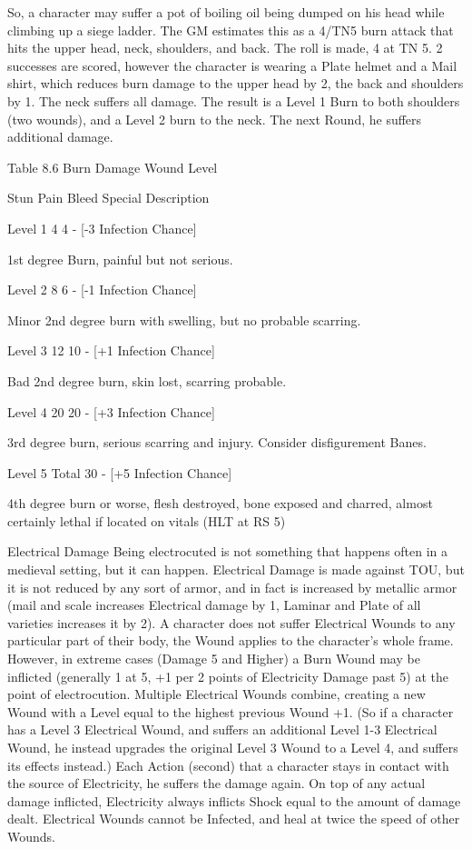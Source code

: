 \documentclass[oneside,11pt,english]{book}
\begin{document}
 

So, a character may suffer a pot of boiling oil being dumped on his head while climbing up a siege ladder. 
The GM estimates this as a 4/TN5 burn attack that hits the upper head, neck, shoulders, and back. The 
roll is made, 4 at TN 5. 
2 successes are scored, however the character is wearing a Plate helmet and a Mail shirt, which reduces 
burn damage to the upper head by 2, the back and shoulders by 1. The neck suffers all damage. 
The result is a Level 1 Burn to both shoulders (two wounds), and a Level 2 burn to the neck. The next 
Round, he suffers additional damage. 

 


Table 8.6 Burn Damage 
Wound 
Level 

Stun Pain Bleed Special Description 

Level 1 4 4 - [-3 Infection 
Chance] 

1st degree Burn, painful but not serious. 

Level 2 8 6 - [-1 Infection 
Chance] 

Minor 2nd degree burn with swelling, but no probable 
scarring. 

Level 3 12 10 - [+1 Infection 
Chance] 

Bad 2nd degree burn, skin lost, scarring probable. 

Level 4 20 20 - [+3 Infection 
Chance] 

3rd degree burn, serious scarring and injury. Consider 
disfigurement Banes. 

Level 5 Total 30 - [+5 Infection 
Chance] 

4th degree burn or worse, flesh destroyed, bone 
exposed and charred, almost certainly lethal if located 
on vitals (HLT at RS 5) 

 

 

 

Electrical Damage 
Being electrocuted is not something that happens often in a medieval setting, but it can happen. Electrical 
Damage is made against TOU, but it is not reduced by any sort of armor, and in fact is increased by 
metallic armor (mail and scale increases Electrical damage by 1, Laminar and Plate of all varieties 
increases it by 2). 
A character does not suffer Electrical Wounds to any particular part of their body, the Wound applies to 
the character’s whole frame. However, in extreme cases (Damage 5 and Higher) a Burn Wound may be 
inflicted (generally 1 at 5, +1 per 2 points of Electricity Damage past 5) at the point of electrocution. 
Multiple Electrical Wounds combine, creating a new Wound with a Level equal to the highest previous 
Wound +1. (So if a character has a Level 3 Electrical Wound, and suffers an additional Level 1-3 
Electrical Wound, he instead upgrades the original Level 3 Wound to a Level 4, and suffers its effects 
instead.) 
Each Action (second) that a character stays in contact with the source of Electricity, he suffers the damage 
again. 
On top of any actual damage inflicted, Electricity always inflicts Shock equal to the amount of damage 
dealt. 
Electrical Wounds cannot be Infected, and heal at twice the speed of other Wounds. 
\end{document}
